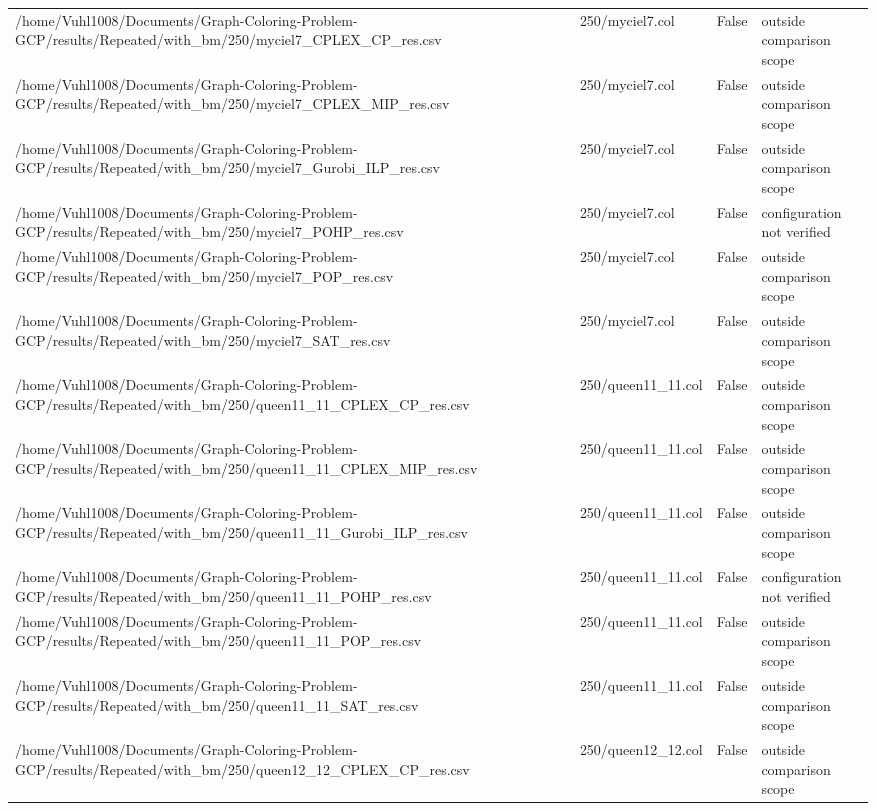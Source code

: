 \begin{table}[htbp]
\begin{tabular}{llll}
/home/Vuhl1008/Documents/Graph-Coloring-Problem-GCP/results/Repeated/with\_bm/250/myciel7\_CPLEX\_CP\_res.csv & 250/myciel7.col & False & outside comparison scope \\
/home/Vuhl1008/Documents/Graph-Coloring-Problem-GCP/results/Repeated/with\_bm/250/myciel7\_CPLEX\_MIP\_res.csv & 250/myciel7.col & False & outside comparison scope \\
/home/Vuhl1008/Documents/Graph-Coloring-Problem-GCP/results/Repeated/with\_bm/250/myciel7\_Gurobi\_ILP\_res.csv & 250/myciel7.col & False & outside comparison scope \\
/home/Vuhl1008/Documents/Graph-Coloring-Problem-GCP/results/Repeated/with\_bm/250/myciel7\_POHP\_res.csv & 250/myciel7.col & False & configuration not verified \\
/home/Vuhl1008/Documents/Graph-Coloring-Problem-GCP/results/Repeated/with\_bm/250/myciel7\_POP\_res.csv & 250/myciel7.col & False & outside comparison scope \\
/home/Vuhl1008/Documents/Graph-Coloring-Problem-GCP/results/Repeated/with\_bm/250/myciel7\_SAT\_res.csv & 250/myciel7.col & False & outside comparison scope \\
/home/Vuhl1008/Documents/Graph-Coloring-Problem-GCP/results/Repeated/with\_bm/250/queen11\_11\_CPLEX\_CP\_res.csv & 250/queen11\_11.col & False & outside comparison scope \\
/home/Vuhl1008/Documents/Graph-Coloring-Problem-GCP/results/Repeated/with\_bm/250/queen11\_11\_CPLEX\_MIP\_res.csv & 250/queen11\_11.col & False & outside comparison scope \\
/home/Vuhl1008/Documents/Graph-Coloring-Problem-GCP/results/Repeated/with\_bm/250/queen11\_11\_Gurobi\_ILP\_res.csv & 250/queen11\_11.col & False & outside comparison scope \\
/home/Vuhl1008/Documents/Graph-Coloring-Problem-GCP/results/Repeated/with\_bm/250/queen11\_11\_POHP\_res.csv & 250/queen11\_11.col & False & configuration not verified \\
/home/Vuhl1008/Documents/Graph-Coloring-Problem-GCP/results/Repeated/with\_bm/250/queen11\_11\_POP\_res.csv & 250/queen11\_11.col & False & outside comparison scope \\
/home/Vuhl1008/Documents/Graph-Coloring-Problem-GCP/results/Repeated/with\_bm/250/queen11\_11\_SAT\_res.csv & 250/queen11\_11.col & False & outside comparison scope \\
/home/Vuhl1008/Documents/Graph-Coloring-Problem-GCP/results/Repeated/with\_bm/250/queen12\_12\_CPLEX\_CP\_res.csv & 250/queen12\_12.col & False & outside comparison scope \\

\end{tabular}
\end{table}
